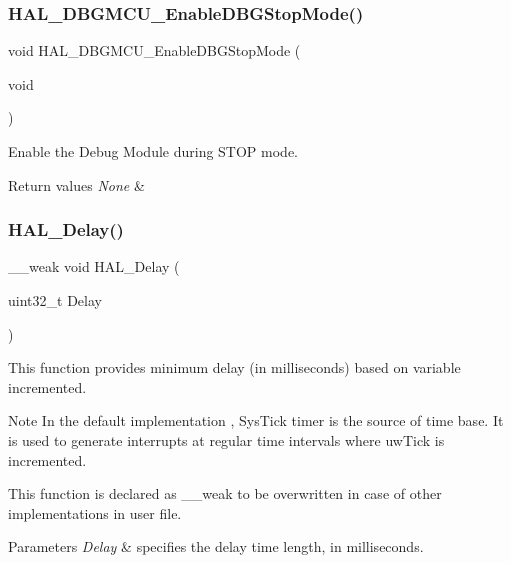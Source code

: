 \subsubsection{\texorpdfstring{HAL\_DBGMCU\_EnableDBGStopMode()}{HAL\_DBGMCU\_EnableDBGStopMode()}}
{\footnotesize\ttfamily void H\+A\+L\+\_\+\+D\+B\+G\+M\+C\+U\+\_\+\+Enable\+D\+B\+G\+Stop\+Mode (\begin{DoxyParamCaption}\item[{void}]{ }\end{DoxyParamCaption})}



Enable the Debug Module during S\+T\+OP mode. 


\begin{DoxyRetVals}{Return values}
{\em None} & \\
\hline
\end{DoxyRetVals}
\mbox{\label{group___h_a_l___exported___functions___group2_gab1dc1e6b438daacfe38a312a90221330}} 
\subsubsection{\texorpdfstring{HAL\_Delay()}{HAL\_Delay()}}
{\footnotesize\ttfamily \+\_\+\+\_\+weak void H\+A\+L\+\_\+\+Delay (\begin{DoxyParamCaption}\item[{uint32\+\_\+t}]{Delay }\end{DoxyParamCaption})}



This function provides minimum delay (in milliseconds) based on variable incremented. 

\begin{DoxyNote}{Note}
In the default implementation , Sys\+Tick timer is the source of time base. It is used to generate interrupts at regular time intervals where uw\+Tick is incremented. 

This function is declared as \+\_\+\+\_\+weak to be overwritten in case of other implementations in user file. 
\end{DoxyNote}

\begin{DoxyParams}{Parameters}
{\em Delay} & specifies the delay time length, in milliseconds. \\
\hline
\end{DoxyParams}

